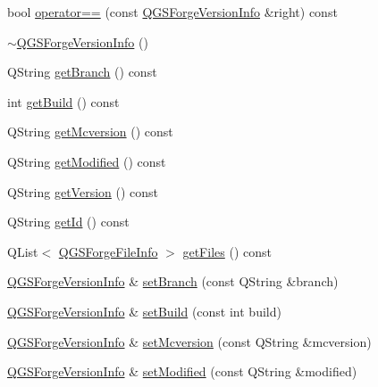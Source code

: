 \begin{DoxyCompactItemize}
\item 
bool \mbox{\hyperlink{class_q_g_s_forge_version_info_a525507c6ac16d6e9fcc001cf2e521874}{operator==}} (const \mbox{\hyperlink{class_q_g_s_forge_version_info}{Q\+G\+S\+Forge\+Version\+Info}} \&right) const
\item 
\mbox{\hyperlink{class_q_g_s_forge_version_info_a3563681257eea58f65c6c0901a73c06e}{$\sim$\+Q\+G\+S\+Forge\+Version\+Info}} ()
\item 
Q\+String \mbox{\hyperlink{class_q_g_s_forge_version_info_a38f7da9bf22d5ed3f5780e6dd9552722}{get\+Branch}} () const
\item 
int \mbox{\hyperlink{class_q_g_s_forge_version_info_a5a22b4180a1e9ae24bd248ebcf18a5d1}{get\+Build}} () const
\item 
Q\+String \mbox{\hyperlink{class_q_g_s_forge_version_info_a8b056337aba1e69ebb45a88c92c93579}{get\+Mcversion}} () const
\item 
Q\+String \mbox{\hyperlink{class_q_g_s_forge_version_info_af21c0b1f99c185da8b01910e87b1deda}{get\+Modified}} () const
\item 
Q\+String \mbox{\hyperlink{class_q_g_s_forge_version_info_ae8c0d633435dec72084006332b0bf68b}{get\+Version}} () const
\item 
Q\+String \mbox{\hyperlink{class_q_g_s_forge_version_info_a0fdf9fd70b4a66bbc16510ad8f594950}{get\+Id}} () const
\item 
Q\+List$<$ \mbox{\hyperlink{class_q_g_s_forge_version_info_1_1_q_g_s_forge_file_info}{Q\+G\+S\+Forge\+File\+Info}} $>$ \mbox{\hyperlink{class_q_g_s_forge_version_info_a3b9a5bcc841223e92014e14ea899d799}{get\+Files}} () const
\item 
\mbox{\hyperlink{class_q_g_s_forge_version_info}{Q\+G\+S\+Forge\+Version\+Info}} \& \mbox{\hyperlink{class_q_g_s_forge_version_info_aeb027060712e1cffa73a583e8a0845aa}{set\+Branch}} (const Q\+String \&branch)
\item 
\mbox{\hyperlink{class_q_g_s_forge_version_info}{Q\+G\+S\+Forge\+Version\+Info}} \& \mbox{\hyperlink{class_q_g_s_forge_version_info_a3d20aa78a31bb0afab8875759abb5586}{set\+Build}} (const int build)
\item 
\mbox{\hyperlink{class_q_g_s_forge_version_info}{Q\+G\+S\+Forge\+Version\+Info}} \& \mbox{\hyperlink{class_q_g_s_forge_version_info_aee63ab67c8ad4f04aee88d3cb549c38f}{set\+Mcversion}} (const Q\+String \&mcversion)
\item 
\mbox{\hyperlink{class_q_g_s_forge_version_info}{Q\+G\+S\+Forge\+Version\+Info}} \& \mbox{\hyperlink{class_q_g_s_forge_version_info_abdfd1ae514663563196333975867496e}{set\+Modified}} (const Q\+String \&modified)

\end{DoxyCompactItemize}

